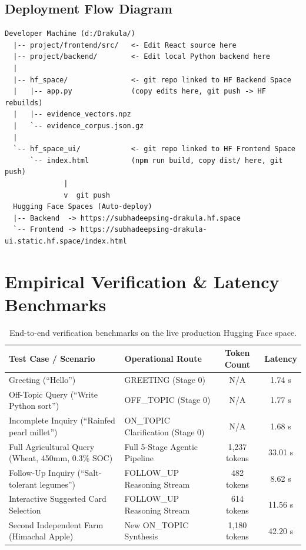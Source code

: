 \documentclass[11pt,a4paper]{article}
\begin{document}
\subsection*{Deployment Flow Diagram}
\begin{lstlisting}[basicstyle=\ttfamily\scriptsize, frame=single, backgroundcolor=\color{boxbg}]
Developer Machine (d:/Drakula/)
  |-- project/frontend/src/   <- Edit React source here
  |-- project/backend/        <- Edit local Python backend here
  |
  |-- hf_space/               <- git repo linked to HF Backend Space
  |   |-- app.py              (copy edits here, git push -> HF rebuilds)
  |   |-- evidence_vectors.npz
  |   `-- evidence_corpus.json.gz
  |
  `-- hf_space_ui/            <- git repo linked to HF Frontend Space
      `-- index.html          (npm run build, copy dist/ here, git push)
              |
              v  git push
  Hugging Face Spaces (Auto-deploy)
  |-- Backend  -> https://subhadeepsing-drakula.hf.space
  `-- Frontend -> https://subhadeepsing-drakula-ui.static.hf.space/index.html
\end{lstlisting}

\section{Empirical Verification \& Latency Benchmarks}

\begin{table}[h!]
\centering
\small
\begin{tabularx}{\textwidth}{lXcc}
\toprule
\textbf{Test Case / Scenario} & \textbf{Operational Route} & \textbf{Token Count} & \textbf{Latency} \\
\midrule
Greeting (``Hello'') & GREETING (Stage 0) & N/A & 1.74 s \\
Off-Topic Query (``Write Python sort'') & OFF\_TOPIC (Stage 0) & N/A & 1.77 s \\
Incomplete Inquiry (``Rainfed pearl millet'') & ON\_TOPIC Clarification (Stage 0) & N/A & 1.68 s \\
Full Agricultural Query (Wheat, 450mm, 0.3\% SOC) & Full 5-Stage Agentic Pipeline & 1,237 tokens & 33.01 s \\
Follow-Up Inquiry (``Salt-tolerant legumes'') & FOLLOW\_UP Reasoning Stream & 482 tokens & 8.62 s \\
Interactive Suggested Card Selection & FOLLOW\_UP Reasoning Stream & 614 tokens & 11.56 s \\
Second Independent Farm (Himachal Apple) & New ON\_TOPIC Synthesis & 1,180 tokens & 42.20 s \\
\bottomrule
\end{tabularx}
\caption{End-to-end verification benchmarks on the live production Hugging Face space.}
\end{table}
\end{document}
